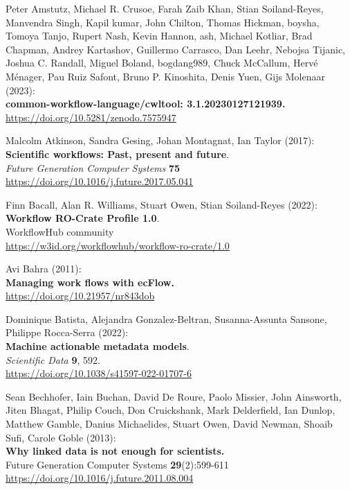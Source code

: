 \documentclass[10pt,letterpaper]{article}
\begin{document}
\begin{thebibliography}{10}
\begin{small}
Peter Amstutz, Michael R. Crusoe, Farah Zaib Khan, Stian Soiland-Reyes, Manvendra Singh, Kapil kumar, John Chilton, Thomas Hickman, boysha, Tomoya Tanjo, Rupert Nash, Kevin Hannon, ash, Michael Kotliar, Brad Chapman, Andrey Kartashov, Guillermo Carrasco, Dan Leehr, Nebojsa Tijanic, Joshua C. Randall, Miguel Boland, bogdang989, Chuck McCallum, Hervé Ménager, Pau Ruiz Safont, Bruno P. Kinoshita, Denis Yuen, Gijs Molenaar (2023):\\
\textbf{common-workflow-language/cwltool: 3.1.20230127121939.}\\
\url{https://doi.org/10.5281/zenodo.7575947}

 Malcolm Atkinson, Sandra Gesing, Johan Montagnat,
Ian Taylor (2017):\\
\textbf{Scientific workflows: Past, present and future}.\\
\emph{Future Generation Computer Systems} \textbf{75}\\
\url{https://doi.org/10.1016/j.future.2017.05.041}

Finn Bacall, Alan R. Williams, Stuart Owen, Stian Soiland-Reyes (2022):\\
\textbf{Workflow RO-Crate Profile 1.0}.\\
WorkflowHub community\\
\url{https://w3id.org/workflowhub/workflow-ro-crate/1.0}

Avi Bahra (2011):\\
\textbf{Managing work flows with ecFlow.}\\
\url{https://doi.org/10.21957/nr843dob}

Dominique Batista, Alejandra Gonzalez-Beltran, Susanna-Assunta Sansone, Philippe Rocca-Serra (2022):\\
\textbf{Machine actionable metadata models}.\\
\emph{Scientific Data} \textbf{9}, 592.\\
\url{https://doi.org/10.1038/s41597-022-01707-6}

Sean Bechhofer, Iain Buchan, David De Roure, Paolo
Missier, John Ainsworth, Jiten Bhagat, Philip Couch, Don Cruickshank,
Mark Delderfield, Ian Dunlop, Matthew Gamble, Danius Michaelides, Stuart
Owen, David Newman, Shoaib Sufi, Carole Goble (2013):\\
\textbf{Why linked data is not enough for scientists.}\\
Future Generation Computer Systems \textbf{29}(2):599-611\\
\url{https://doi.org/10.1016/j.future.2011.08.004}


\end{small}
\end{thebibliography}
\end{document}
